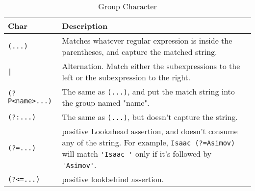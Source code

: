 \documentclass{article}
\begin{document}
\begin{table}[ht]
\caption{Group Character}
\centering
\begin{tabular}{l p{8cm}}
\hline\hline
Char & Description \\[0.5ex]
\hline
\verb/(...)/ & Matches whatever regular expression is inside the parentheses, and capture the matched string.\\
\verb/|/ & Alternation. Match either the subexpressions to the left or the
subexpression to the right.\\
\verb/(?P<name>...)/ & The same as \verb/(...)/, and put the match string into the group named "name".\\
\verb/(?:...)/ & The same as \verb/(...)/, but doesn't capture the string.\\
\verb/(?=...)/ & positive Lookahead assertion, and doesn’t consume any of the string. For example, \verb/Isaac (?=Asimov)/ will match \verb/'Isaac '/ only if it’s followed by \verb/'Asimov'/.\\
\verb/(?<=...)/ & positive lookbehind assertion.\\

\hline
\end{tabular}
\label{table:gc}
\end{table}



\end{document}
